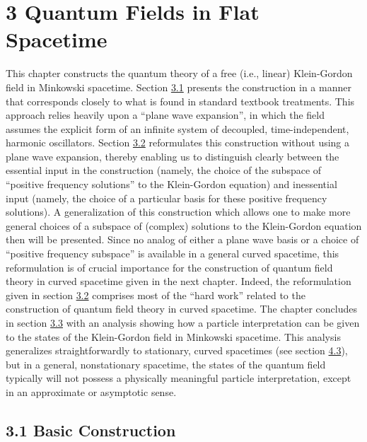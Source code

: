 \documentclass[11pt,a4paper]{article}
\begin{document}
\clearpage
\hypertarget{source-44}{}
\section*{3 Quantum Fields in Flat Spacetime}\hypertarget{sec:3}{}

This chapter constructs the quantum theory of a free (i.e., linear) Klein-Gordon field in Minkowski spacetime. Section \hyperlink{sec:3.1}{3.1} presents the construction in a manner that corresponds closely to what is found in standard textbook treatments. This approach relies heavily upon a ``plane wave expansion'', in which the field assumes the explicit form of an infinite system of decoupled, time-independent, harmonic oscillators. Section \hyperlink{sec:3.2}{3.2} reformulates this construction without using a plane wave expansion, thereby enabling us to distinguish clearly between the essential input in the construction (namely, the choice of the subspace of ``positive frequency solutions'' to the Klein-Gordon equation) and inessential input (namely, the choice of a particular basis for these positive frequency solutions). A generalization of this construction which allows one to make more general choices of a subspace of (complex) solutions to the Klein-Gordon equation then will be presented. Since no analog of either a plane wave basis or a choice of ``positive frequency subspace'' is available in a general curved spacetime, this reformulation is of crucial importance for the construction of quantum field theory in curved spacetime given in the next chapter. Indeed, the reformulation given in section \hyperlink{sec:3.2}{3.2} comprises most of the ``hard work'' related to the construction of quantum field theory in curved spacetime. The chapter concludes in section \hyperlink{sec:3.3}{3.3} with an analysis showing how a particle interpretation can be given to the states of the Klein-Gordon field in Minkowski spacetime. This analysis generalizes straightforwardly to stationary, curved spacetimes (see section \hyperlink{sec:4.3}{4.3}), but in a general, nonstationary spacetime, the states of the quantum field typically will not possess a physically meaningful particle interpretation, except in an approximate or asymptotic sense.

\subsection*{3.1 Basic Construction}\hypertarget{sec:3.1}{}
\end{document}
